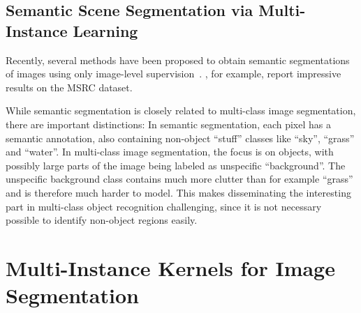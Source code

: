 

\subsection{Semantic Scene Segmentation via Multi-Instance Learning}
Recently, several methods have been proposed to obtain semantic segmentations
of images using only image-level
supervision~\citep{vezhnevets2011weakly,verbeek2007region,vezhnevets2010towards}.
\citet{vezhnevets2011weakly}, for example, report impressive results on the
MSRC dataset.

While semantic segmentation is closely related to multi-class image
segmentation, there are important distinctions: In semantic segmentation, each
pixel has a semantic annotation, also containing non-object ``stuff'' classes like
``sky'', ``grass'' and ``water''. In multi-class image segmentation, the focus
is on objects, with possibly large parts of the image being labeled as
unspecific ``background''.  The unspecific background class contains much more
clutter than for example ``grass'' and is therefore much harder to model.
This makes disseminating the interesting part in multi-class object recognition
challenging, since it is not necessary possible to identify non-object regions
easily.


\section{Multi-Instance Kernels for Image Segmentation}
